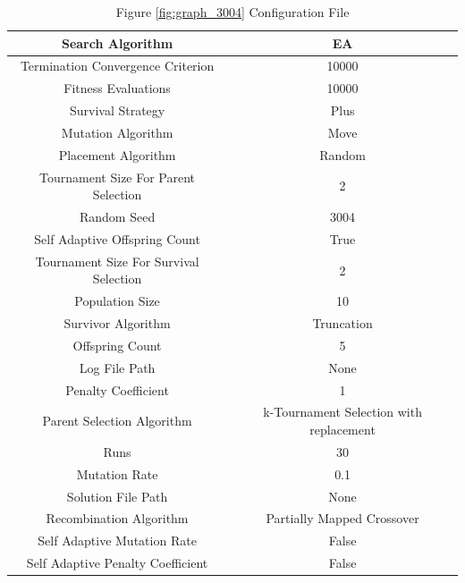 \documentclass{standalone}
\begin{document}
\begin{table}[!htb]
	\centering
	\caption{Figure \ref{fig:graph_3004} Configuration File}
	\label{tab:graph_3004}
	\begin{tabular}{| c | c |}
		\hline
		Search Algorithm		& EA		 \\
		\hline
		Termination Convergence Criterion		& 10000		 \\
		\hline
		Fitness Evaluations		& 10000		 \\
		\hline
		Survival Strategy		& Plus		 \\
		\hline
		Mutation Algorithm		& Move		 \\
		\hline
		Placement Algorithm		& Random		 \\
		\hline
		Tournament Size For Parent Selection		& 2		 \\
		\hline
		Random Seed		& 3004		 \\
		\hline
		Self Adaptive Offspring Count		& True		 \\
		\hline
		Tournament Size For Survival Selection		& 2		 \\
		\hline
		Population Size		& 10		 \\
		\hline
		Survivor Algorithm		& Truncation		 \\
		\hline
		Offspring Count		& 5		 \\
		\hline
		Log File Path		& None		 \\
		\hline
		Penalty Coefficient		& 1		 \\
		\hline
		Parent Selection Algorithm		& k-Tournament Selection with replacement		 \\
		\hline
		Runs		& 30		 \\
		\hline
		Mutation Rate		& 0.1		 \\
		\hline
		Solution File Path		& None		 \\
		\hline
		Recombination Algorithm		& Partially Mapped Crossover		 \\
		\hline
		Self Adaptive Mutation Rate		& False		 \\
		\hline
		Self Adaptive Penalty Coefficient		& False		 \\
		\hline
	\end{tabular}
\end{table}
\end{document}
